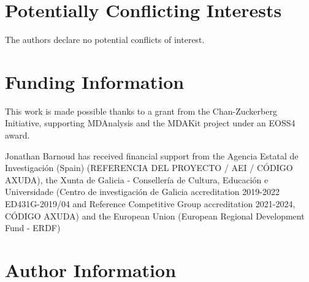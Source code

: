 \documentclass[9pt,whitepaper]{livecoms}
\newcommand{\githubrepository}{\url{https://github.com/MDAnalysis/MDAKits}}
\begin{document}

%



\section*{Potentially Conflicting Interests}

The authors declare no potential conflicts of interest.

\section*{Funding Information}

This work is made possible thanks to a grant from the Chan-Zuckerberg Initiative, supporting MDAnalysis and the MDAKit project under an EOSS4 award.

Jonathan Barnoud has received financial support from the Agencia Estatal de Investigación (Spain) (REFERENCIA DEL PROYECTO / AEI / CÓDIGO AXUDA), the Xunta de Galicia - Consellería de Cultura, Educación e Universidade (Centro de investigación de Galicia accreditation 2019-2022 ED431G-2019/04 and Reference Competitive Group accreditation 2021-2024, CÓDIGO AXUDA) and the European Union (European Regional Development Fund - ERDF)


\section*{Author Information}
\makeorcid




\end{document}
